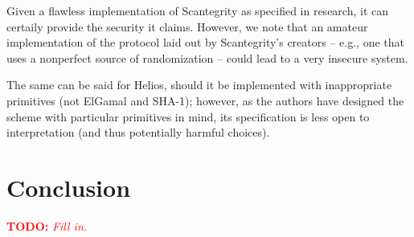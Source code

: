 \documentclass[10pt]{article}
\newcommand{\todo}[1]{\textcolor{red}{\textbf{TODO:} \emph{#1}}}
\begin{document}
\begin{multicols}{2}
Given a flawless implementation of Scantegrity as specified in research, it can certaily provide the
security it claims. However, we note that an amateur implementation of the protocol laid out by
Scantegrity's creators -- e.g., one that uses a nonperfect source of randomization -- could lead to
a very insecure system.

The same can be said for Helios, should it be implemented with inappropriate primitives (not ElGamal
and SHA-1); however, as the authors have designed the scheme with particular primitives in mind, its
specification is less open to interpretation (and thus potentially harmful choices).

\section{Conclusion}

\todo{Fill in.}

{}


\end{multicols}
\end{document}
